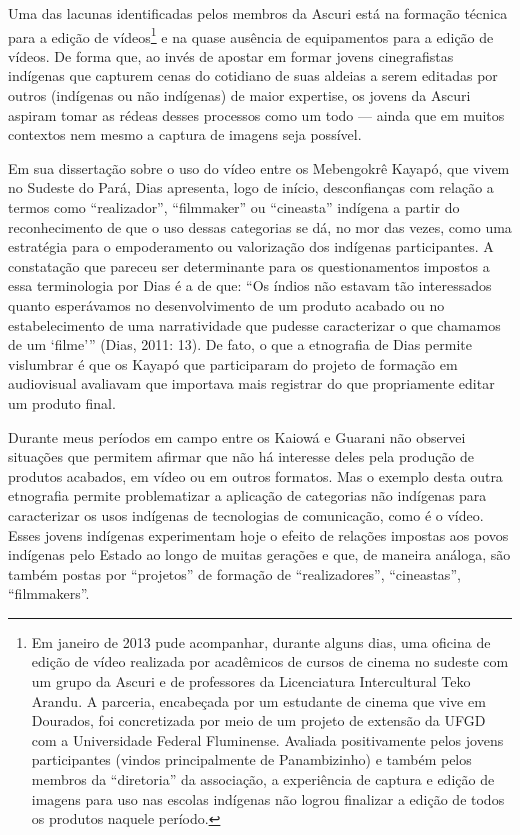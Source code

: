 Uma das lacunas identificadas pelos membros da Ascuri está na formação
técnica para a edição de vídeos\footnote{Em janeiro de 2013 pude
  acompanhar, durante alguns dias, uma oficina de edição de vídeo
  realizada por acadêmicos de cursos de cinema no sudeste com um grupo
  da Ascuri e de professores da Licenciatura Intercultural Teko Arandu.
  A parceria, encabeçada por um estudante de cinema que vive em
  Dourados, foi concretizada por meio de um projeto de extensão da UFGD
  com a Universidade Federal Fluminense. Avaliada positivamente pelos
  jovens participantes (vindos principalmente de Panambizinho) e também
  pelos membros da ``diretoria'' da associação, a experiência de captura
  e edição de imagens para uso nas escolas indígenas não logrou
  finalizar a edição de todos os produtos naquele período.} e na quase
ausência de equipamentos para a edição de vídeos. De forma que, ao invés
de apostar em formar jovens cinegrafistas indígenas que capturem cenas
do cotidiano de suas aldeias a serem editadas por outros (indígenas ou
não indígenas) de maior expertise, os jovens da Ascuri aspiram tomar as
rédeas desses processos como um todo --- ainda que em muitos contextos
nem mesmo a captura de imagens seja possível.

Em sua dissertação sobre o uso do vídeo entre os Mebengokrê Kayapó, que
vivem no Sudeste do Pará, Dias apresenta, logo de início, desconfianças
com relação a termos como ``realizador'', ``filmmaker'' ou ``cineasta''
indígena a partir do reconhecimento de que o uso dessas categorias se
dá, no mor das vezes, como uma estratégia para o empoderamento ou
valorização dos indígenas participantes. A constatação que pareceu ser
determinante para os questionamentos impostos a essa terminologia por
Dias é a de que: ``Os índios não estavam tão interessados quanto
esperávamos no desenvolvimento de um produto acabado ou no
estabelecimento de uma narratividade que pudesse caracterizar o que
chamamos de um `filme''' (Dias, 2011: 13). De fato, o que a etnografia
de Dias permite vislumbrar é que os Kayapó que participaram do projeto
de formação em audiovisual avaliavam que importava mais registrar do que
propriamente editar um produto final.

Durante meus períodos em campo entre os Kaiowá e Guarani não observei
situações que permitem afirmar que não há interesse deles pela produção
de produtos acabados, em vídeo ou em outros formatos. Mas o exemplo
desta outra etnografia permite problematizar a aplicação de categorias
não indígenas para caracterizar os usos indígenas de tecnologias de
comunicação, como é o vídeo. Esses jovens indígenas experimentam hoje o
efeito de relações impostas aos povos indígenas pelo Estado ao longo de
muitas gerações e que, de maneira análoga, são também postas por
``projetos'' de formação de ``realizadores'', ``cineastas'',
``filmmakers''.


